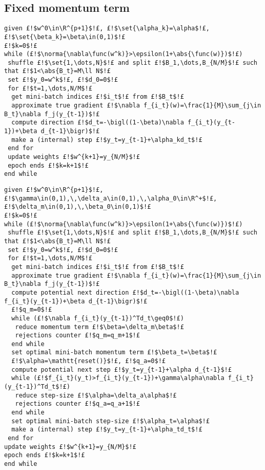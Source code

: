 \cleardoublepage
\subsection{Fixed momentum term}

\begin{lstlisting}[style=simple,caption={Mini-batch Gradient Descent with fixed Momentum term and fixed step-size}]
given £!$w^0\in\R^{p+1}$!£, £!$\set{\alpha_k}=\alpha$!£, £!$\set{\beta_k}=\beta\in(0,1)$!£
£!$k=0$!£
while (£!$\norma{\nabla\func(w^k)}>\epsilon(1+\abs{\func(w)})$!£)
 shuffle £!$\set{1,\dots,N}$!£ and split £!$B_1,\dots,B_{N/M}$!£ such that £!$1<\abs{B_t}=M\ll N$!£
 set £!$y_0=w^k$!£, £!$d_0=0$!£
 for £!$t=1,\dots,N/M$!£
  get mini-batch indices £!$i_t$!£ from £!$B_t$!£
  approximate true gradient £!$\nabla f_{i_t}(w)=\frac{1}{M}\sum_{j\in B_t}\nabla f_j(y_{t-1})$!£
  compute direction £!$d_t=-\bigl((1-\beta)\nabla f_{i_t}(y_{t-1})+\beta d_{t-1}\bigr)$!£
  make a (internal) step £!$y_t=y_{t-1}+\alpha_kd_t$!£
 end for
 update weights £!$w^{k+1}=y_{N/M}$!£
 epoch ends £!$k=k+1$!£
end while
\end{lstlisting}

\begin{lstlisting}[style=simple,caption={Mini-batch Gradient Descent with Armijo line search for step-size and Momentum correction}]
given £!$w^0\in\R^{p+1}$!£, £!$\gamma\in(0,1),\,\delta_a\in(0,1),\,\alpha_0\in\R^+$!£, £!$\delta_m\in(0,1),\,\beta_0\in(0,1)$!£
£!$k=0$!£
while (£!$\norma{\nabla\func(w^k)}>\epsilon(1+\abs{\func(w)})$!£)
 shuffle £!$\set{1,\dots,N}$!£ and split £!$B_1,\dots,B_{N/M}$!£ such that £!$1<\abs{B_t}=M\ll N$!£
 set £!$y_0=w^k$!£, £!$d_0=0$!£
 for £!$t=1,\dots,N/M$!£
  get mini-batch indices £!$i_t$!£ from £!$B_t$!£
  approximate true gradient £!$\nabla f_{i_t}(w)=\frac{1}{M}\sum_{j\in B_t}\nabla f_j(y_{t-1})$!£
  compute potential next direction £!$d_t=-\bigl((1-\beta)\nabla f_{i_t}(y_{t-1})+\beta d_{t-1}\bigr)$!£
  £!$q_m=0$!£
  while (£!$\nabla f_{i_t}(y_{t-1})^Td_t\geq0$!£)
   reduce momentum term £!$\beta=\delta_m\beta$!£
   rejections counter £!$q_m=q_m+1$!£
  end while
  set optimal mini-batch momentum term £!$\beta_t=\beta$!£
  £!$\alpha=\mathtt{reset()}$!£, £!$q_a=0$!£
  compute potential next step £!$y_t=y_{t-1}+\alpha d_{t-1}$!£
  while (£!$f_{i_t}(y_t)>f_{i_t}(y_{t-1})+\gamma\alpha\nabla f_{i_t}(y_{t-1})^Td_t$!£)
   reduce step-size £!$\alpha=\delta_a\alpha$!£
   rejections counter £!$q_a=q_a+1$!£
  end while
  set optimal mini-batch step-size £!$\alpha_t=\alpha$!£
  make a (internal) step £!$y_t=y_{t-1}+\alpha_td_t$!£
 end for
update weights £!$w^{k+1}=y_{N/M}$!£
epoch ends £!$k=k+1$!£
end while
\end{lstlisting}

